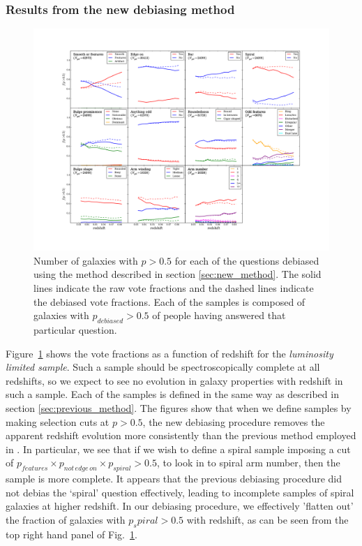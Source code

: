 \documentclass[useAMS,usenatbib]{mn2e}
\begin{document}
\subsubsection{Results from the new debiasing method}

\begin{figure}
		\centering

        \includegraphics[width=1\textwidth]{Bias_imgs/vote_panel_plot_debiased.pdf}

        \caption{Number of galaxies with $p>0.5$ for each of the questions debiased using the method described in section \ref{sec:new_method}. The solid lines indicate the raw vote fractions and the dashed lines indicate the debiased vote fractions. Each of the samples is composed of galaxies with $p_{debiased}>0.5$ of people having answered that particular question.}

        \label{fig:vote_panel_debiased}

\end{figure}

Figure~\ref{fig:vote_panel_debiased} shows the vote fractions as a function of redshift for the \textit{luminosity limited sample}. Such a sample should be spectroscopically complete at all redshifts, so we expect to see no evolution in galaxy properties with redshift in such a sample. Each of the samples is defined in the same way as described in section \ref{sec:previous_method}. The figures show that when we define samples by making selection cuts at $p>0.5$, the new debiasing procedure removes the apparent redshift evolution more consistently than the previous method employed in \citet{Willett_13}. In particular, we see that if we wish to define a spiral sample imposing a cut of $p_{features} \times p_{not \, edge \, on} \times p_{spiral} > 0.5$, to look in to spiral arm number, then the sample is more complete. It appears that the previous debiasing procedure did not debias the `spiral' question effectively, leading to incomplete samples of spiral galaxies at higher redshift. In our debiasing procedure, we effectively 'flatten out' the fraction of galaxies with $p_spiral>0.5$ with redshift, as can be seen from the top right hand panel of Fig.~\ref{fig:vote_panel_debiased}.
\end{document}
